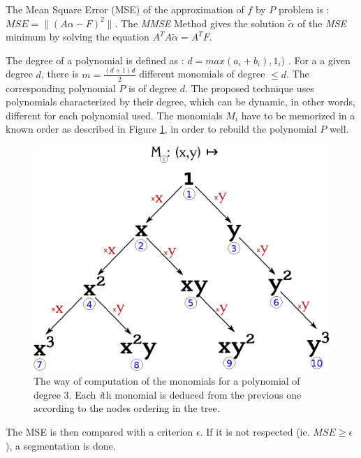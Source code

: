 \documentclass[fleqn,10pt]{SelfArx} %
\begin{document}
The Mean Square Error (MSE) of the approximation of $f$ by $P$  problem is : $MSE = \|(A\alpha - F)^2\|$. The \emph{MMSE} Method gives the solution $\tilde{\alpha}$ of the \emph{MSE} minimum by solving the equation $A^T A \tilde{\alpha} = A^T F$.

The degree of a polynomial is defined as : $d = max(a_i + b_i), 1_i)$ \cite{polynomials}. For a a given degree $d$, there is $m = \frac{(d+1)d}{2}$ different monomials of degree $\leq d$. The corresponding polynomial $P$ is of degree $d$. The proposed technique uses polynomials characterized by their degree, which can be dynamic, in other words, different for each polynomial used.
The monomials $M_i$ have to be memorized in a known order as described in Figure \ref{tree_mapping}, in order to rebuild the polynomial $P$ well.

\begin{figure}
    \centering
    \includegraphics[width=\columnwidth]{graphics/tree_mapping.eps}
    \caption{The way of computation of the monomials for a polynomial of degree 3. Each \emph{i}th monomial is deduced from the previous one according to the nodes ordering in the tree.}
    \label{tree_mapping}
\end{figure}

The MSE is then compared with a criterion $\epsilon$. If it is not respected (ie. $MSE \geq \epsilon$), a segmentation is done.
\end{document}
